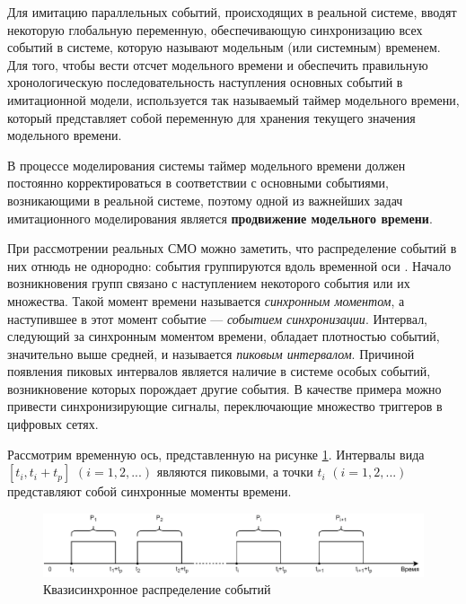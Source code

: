 

Для имитацию параллельных событий, происходящих в реальной системе, вводят некоторую глобальную переменную, обеспечивающую синхронизацию всех событий в системе, которую называют модельным (или системным) временем. Для того, чтобы вести отсчет модельного времени и обеспечить правильную хронологическую последовательность наступления основных событий в имитационной модели, используется так называемый таймер модельного времени, который представляет собой переменную для хранения текущего значения модельного времени.

В процессе моделирования системы таймер модельного времени должен постоянно корректироваться в соответствии с основными событиями, возникающими в реальной системе, поэтому одной из важнейших задач имитационного моделирования является \textbf{продвижение модельного времени}.

При рассмотрении реальных СМО можно заметить, что распределение событий в них отнюдь не однородно: события группируются вдоль временной оси \cite{system_modelling}. Начало возникновения групп связано с наступлением некоторого события или их множества. Такой момент времени называется \textit{синхронным моментом}, а наступившее в этот момент событие --- \textit{событием синхронизации}. Интервал, следующий за синхронным моментом времени, обладает плотностью событий, значительно выше средней, и называется \textit{пиковым интервалом}. Причиной появления пиковых интервалов является наличие в системе особых событий, возникновение которых порождает другие события. В качестве примера можно привести синхронизирующие сигналы, переключающие множество триггеров в цифровых сетях.

Рассмотрим временную ось, представленную на рисунке \ref{img:delft_example}. Интервалы вида $[t_i, t_i + t_p]$ $(i = 1, 2, ...)$ являются пиковыми, а точки $t_i$ $(i = 1, 2, ...)$ представляют собой синхронные моменты времени.

\begin{figure}[h!btp]
	\centering
	\includegraphics[width=0.9\columnwidth]{inc/img/delft_example.pdf}
	\caption{Квазисинхронное распределение событий}
	\label{img:delft_example}	
\end{figure}

